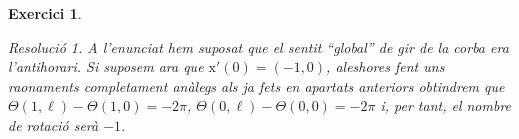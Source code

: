 \documentclass[10pt,a4paper]{article}
\newcommand{\vf}[1]{\boldsymbol{\mathrm{#1}}} %
\newtheorem{exercice}{Exercici}
\theoremstyle{remark}
\newtheorem*{resolution}{Resolució}
\theoremstyle{math}
\begin{document}
\begin{exercice}
\begin{enumerate}
\begin{resolution}
            A l'enunciat hem suposat que el sentit ``global'' de gir de la corba era l'antihorari. Si suposem ara que $\vf{x}'(0)=(-1,0)$, aleshores fent uns raonaments completament anàlegs als ja fets en apartats anteriors obtindrem que $\Theta(1,\ell)-\Theta(1,0)=-2\pi$, $\Theta(0,\ell)-\Theta(0,0)=-2\pi$ i, per tant, el nombre de rotació serà $-1$.
          \end{resolution}
  \end{enumerate}
\end{exercice}
\vspace{0.5cm}
\end{document}
